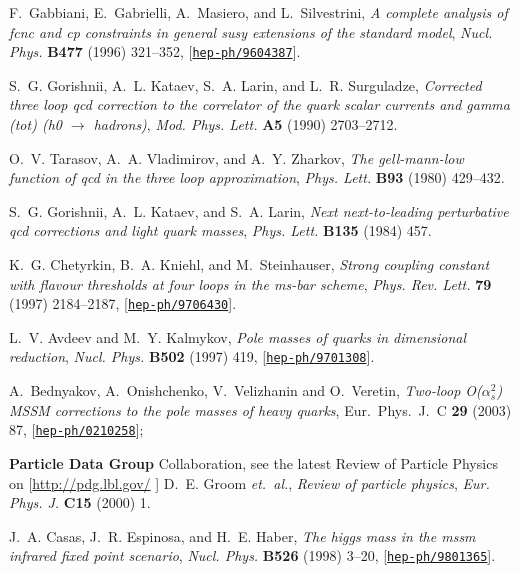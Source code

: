 \documentclass{article}
\begin{document}
\begin{thebibliography}{10}
F.~Gabbiani, E.~Gabrielli, A.~Masiero, and L.~Silvestrini, {\it A complete
  analysis of fcnc and cp constraints in general susy extensions of the
  standard model},  {\em Nucl. Phys.} {\bf B477} (1996) 321--352,
  [\href{http://xxx.lanl.gov/abs/hep-ph/9604387}{{\tt hep-ph/9604387}}].

S.~G. Gorishnii, A.~L. Kataev, S.~A. Larin, and L.~R. Surguladze, {\it
  Corrected three loop qcd correction to the correlator of the quark scalar
  currents and gamma (tot) (h0 $\to$ hadrons)},  {\em Mod. Phys. Lett.} {\bf
  A5} (1990) 2703--2712.

O.~V. Tarasov, A.~A. Vladimirov, and A.~Y. Zharkov, {\it The gell-mann-low
  function of qcd in the three loop approximation},  {\em Phys. Lett.} {\bf
  B93} (1980) 429--432.

S.~G. Gorishnii, A.~L. Kataev, and S.~A. Larin, {\it Next next-to-leading
  perturbative qcd corrections and light quark masses},  {\em Phys. Lett.} {\bf
  B135} (1984) 457.

K.~G. Chetyrkin, B.~A. Kniehl, and M.~Steinhauser, {\it Strong coupling
  constant with flavour thresholds at four loops in the ms-bar scheme},  {\em
  Phys. Rev. Lett.} {\bf 79} (1997) 2184--2187,
  [\href{http://xxx.lanl.gov/abs/hep-ph/9706430}{{\tt hep-ph/9706430}}].

L.~V. Avdeev and M.~Y. Kalmykov, {\it Pole masses of quarks in dimensional
  reduction}, {\em Nucl. Phys. } {\bf B502} (1997) 419,
  [\href{http://xxx.lanl.gov/abs/hep-ph/9701308}{{\tt hep-ph/9701308}}].

A.~Bednyakov, A.~Onishchenko, V.~Velizhanin and O.~Veretin,
{\it Two-loop O($\alpha_s^2$) MSSM corrections to the pole masses of heavy
  quarks}, Eur.\ Phys.\ J.\ C {\bf 29} (2003) 87,
  [\href{http://xxx.lanl.gov/abs/hep-ph/0210258}{{\tt hep-ph/0210258}}];

{\bf Particle Data Group} Collaboration, 
see the latest Review of Particle Physics on 
  [\href{http://pdg.lbl.gov/}{http://pdg.lbl.gov/}
]
D.~E. Groom {\em et.~al.}, {\it Review
  of particle physics},  {\em Eur. Phys. J.} {\bf C15} (2000) 1.

J.~A. Casas, J.~R. Espinosa, and H.~E. Haber, {\it The higgs mass in the mssm
  infrared fixed point scenario},  {\em Nucl. Phys.} {\bf B526} (1998) 3--20,
  [\href{http://xxx.lanl.gov/abs/hep-ph/9801365}{{\tt hep-ph/9801365}}].


\end{thebibliography}
\end{document}
